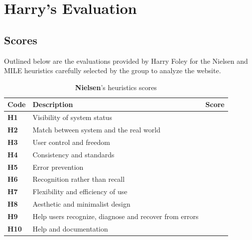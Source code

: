 \section{Harry's Evaluation}
\subsection{Scores}
Outlined below are the evaluations provided by Harry Foley for the Nielsen and MILE heuristics carefully selected by the group to analyze the website.\\
\begin{table}[htp!]
    \centering
    \begin{tabular}{ |l|l|c| }
        \hline
        \textbf{Code} & \textbf{Description} & \textbf{Score}\\
        \hline
        \textbf{H1} & Visibility of system status & \textbf{\color{unicefRed}{2}}\\
        \hline
        \textbf{H2} & Match between system and the real world & \textbf{\color{unicefGreen}{5}}\\
        \hline
        \textbf{H3} & User control and freedom & \textbf{\color{unicefRed}{3}}\\
        \hline
        \textbf{H4} & Consistency and standards & \textbf{\color{unicefGreen}{5}}\\
        \hline
        \textbf{H5} & Error prevention & \textbf{\color{unicefGreen}{5}}\\
        \hline
        \textbf{H6} & Recognition rather than recall & \textbf{\color{unicefGreen}{4}}\\
        \hline
        \textbf{H7} & Flexibility and efficiency of use & \textbf{\color{unicefRed}{2}}\\
        \hline
        \textbf{H8} & Aesthetic and minimalist design & \textbf{\color{unicefGreen}{4}}\\
        \hline
        \textbf{H9} & Help users recognize, diagnose and recover from errors & \textbf{\color{unicefGreen}{5}}\\
        \hline
        \textbf{H10} & Help and documentation & \textbf{\color{unicefGray}{n.a}}\\
        \hline
    \end{tabular}
    \caption{\textbf{Nielsen}'s heuristics scores}
\end{table}

